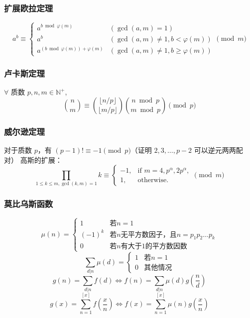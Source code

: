\subsubsection{扩展欧拉定理}
\begin{equation*}
    a^b \equiv \begin{cases} a^{b \bmod \varphi(m)} & (\gcd(a, m) = 1) \\ a^b & (\gcd(a, m) \ne 1, b < \varphi(m)) \\ a^{(b \bmod \varphi(m)) + \varphi(m)} & (\gcd(a, m) \ne 1, b \ge \varphi(m)) \end{cases} \pmod m
\end{equation*}

\subsubsection{卢卡斯定理}
\noindent $\forall$ 质数 $p, n, m \in \mathbb{N}^{+}$,
\begin{equation*}
    \binom{n}{m} \equiv \binom{\lfloor n/p \rfloor}{\lfloor m/p \rfloor}
    \binom{n \bmod p}{m \bmod p} \pmod p
\end{equation*}

\subsubsection{威尔逊定理}
\noindent 对于质数 $p$，有 $(p-1)! \equiv -1 \pmod p$（证明 $2, 3, \ldots, p -
2$ 可以逆元两两配对）
\noindent 高斯的扩展：
\begin{equation*}
    \prod_{1 \le k \le m, \gcd(k, m) = 1} k \equiv \begin{cases} -1, &
    \text{if } m = 4, p^\alpha, 2p^\alpha, \\ 1, & \text{otherwise}. \end{cases}
    \pmod m
\end{equation*}

\subsubsection{莫比乌斯函数}
	$$\mu(n) = \begin{cases}
		1 & \text{若}n=1\\
		(-1)^k & \text{若}n\text{无平方数因子，且}n = p_1p_2\dots p_k\\
		0 & \text{若}n\text{有大于}1\text{的平方数因数}
	\end{cases}$$
	$$\sum_{d|n}{\mu(d)} = \begin{cases}
		1 & \text{若}n=1\\
		0 & \text{其他情况}
	\end{cases}$$
	$$g(n) = \sum_{d|n}{f(d)} \Leftrightarrow f(n) = \sum_{d|n}{\mu(d)g(\frac{n}{d})}$$
	$$g(x) = \sum_{n=1}^{[x]}f(\frac{x}{n}) \Leftrightarrow f(x) = \sum_{n=1}^{[x]}{\mu(n)g(\frac{x}{n})}$$
